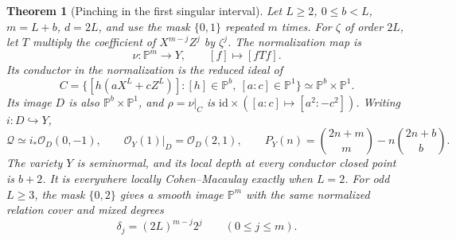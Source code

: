 \documentclass[10pt,fleqn]{article}
\numberwithin{equation}{section}
\newtheorem{theorem}{Theorem}[section]
\newcommand{\PP}{\mathbb P}
\begin{document}
\begin{theorem}[Pinching in the first singular interval]
\label{v7:cond:first-interval}\label{v6:cond:high-dimensional}
Let $L\ge2$, $0\le b<L$, $m=L+b$, $d=2L$, and use the mask $\{0,1\}$
repeated $m$ times.  For $\zeta$ of order $2L$, let $T$ multiply the
coefficient of $X^{m-j}Z^j$ by $\zeta^j$.  The normalization map is
\begin{equation}\label{v6:cond:high-map}
 \nu:\PP^m\longrightarrow Y,\qquad[f]\longmapsto[fTf].
\end{equation}
Its conductor in the normalization is the reduced ideal of
\[
 C=\{[h(aX^L+cZ^L)]:[h]\in\PP^b,\ [a:c]\in\PP^1\}
       \simeq\PP^b\times\PP^1.
\]
Its image $D$ is also $\PP^b\times\PP^1$, and
$\rho=\nu|_C$ is $\mathrm{id}\times([a:c]\mapsto[a^2:-c^2])$.
Writing $i:D\hookrightarrow Y$,
\begin{equation}\label{v6:cond:high-quotient}
 \mathcal Q\simeq i_*\mathcal O_D(0,-1),\qquad
 \mathcal O_Y(1)|_D=\mathcal O_D(2,1),\qquad
 P_Y(n)=\binom{2n+m}{m}-n\binom{2n+b}{b}.
\end{equation}
The variety $Y$ is seminormal, and its local depth at every conductor
closed point is $b+2$.  It is everywhere locally Cohen--Macaulay exactly
when $L=2$.  For odd $L\ge3$, the mask $\{0,2\}$ gives a smooth image
$\PP^m$ with the same normalized relation cover and mixed degrees
\begin{equation}\label{v6:cond:high-degrees}
 \delta_j=(2L)^{m-j}2^j\qquad(0\le j\le m).
\end{equation}
\end{theorem}
\end{document}
